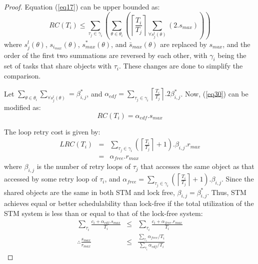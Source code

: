 \documentclass[12pt,english]{report}
\newtheorem{proof}{Proof}
\begin{document}
\begin{proof}\normalfont
Equation (\ref{eq17}) can be upper bounded as:
\begin{equation}
RC\left(T_{i}\right) \le \sum_{\tau_{j}\in\gamma_{i}}\left(\sum_{\theta\in\theta_{i}}\left(\left\lceil\frac{T_{i}}{T_{j}}\right\rceil\sum_{\forall s_{j}^{l}\left(\theta\right)}\left(2.s_{max}\right)\right)\right)
\label{eq30}
\end{equation}
where $s_{j}^{l}\left(\theta\right)$, $s_{i_{max}}\left(\theta\right)$,
$s_{max}^{*}\left(\theta\right)$, and $\bar{s}_{max}\left(\theta\right)$ are replaced by $s_{max}$, and the order of the first two summations are reversed
by each other, 
with $\gamma_{i}$ being the set of tasks that share objects
with $\tau_{i}$. These changes are done to simplify the comparison.

Let $\sum_{\theta\in\theta_{i}}\sum_{\forall s_{j}^{l}\left(\theta\right)}=\beta_{i,j}^{*}$, and $\alpha_{edf}=\sum_{\tau_{j}\in\gamma_{i}}\left\lceil\frac{T_{i}}{T_{j}}\right\rceil.2\beta_{i,j}^*$. Now, (\ref{eq30}) can be modified as:
\begin{equation}
RC\left(T_{i}\right)=\alpha_{edf}.s_{max}
\label{eq31}
\end{equation}

The loop retry cost is given by:
\begin{eqnarray}
LRC\left(T_i\right)&=&\sum_{\tau_{j}\in\gamma_{i}}\left(\left\lceil\frac{T_{i}}{T_{j}}\right\rceil+1\right).\beta_{i,j}.r_{max}\nonumber \\
&=& \alpha_{free} . r_{max} \label{eq32}
\end{eqnarray}
where $\beta_{i,j}$ is the number of retry loops of $\tau_{j}$ that accesses the same object as that accessed by some retry loop of $\tau_{i}$, and $\alpha_{free} = \sum_{\tau_{j}\in\gamma_{i}}\left(\left\lceil\frac{T_{i}}{T_{j}}\right\rceil + 1 \right).\beta_{i,j}$.
Since the shared objects are the same in both STM and lock free, $\beta_{i,j}=\beta_{i,j}^{*}$.
Thus, STM achieves equal or better schedulability 
than lock-free if the total utilization of the STM system is less than or equal to that of the lock-free system:
\begin{eqnarray}
\sum_{\tau_{i}}\frac{c_{i}+\alpha_{edf}.s_{max}} {T_{i}} & \le & \sum_{\tau_{i}}\frac{c_{i}+\alpha_{free}.r_{max}}{T_{i}} \nonumber \\
\therefore\frac{s_{max}}{r_{max}} & \le & \frac{\sum_{\tau_{i}}\alpha_{free}/T_{i}}{\sum_{\tau_{i}}\alpha_{edf}/T_{i}}\end{eqnarray}



\end{proof}
\end{document}
